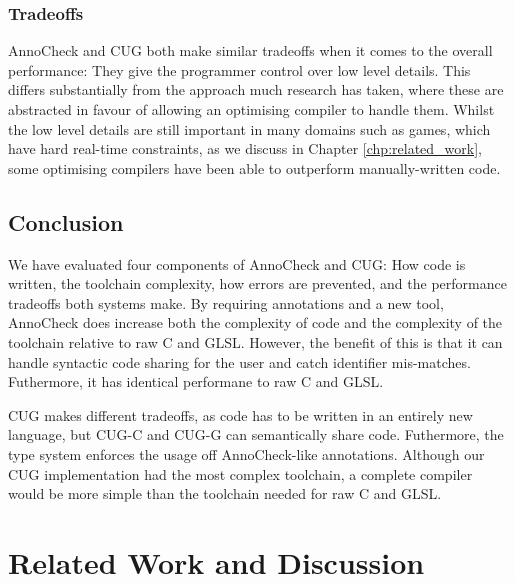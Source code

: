 \documentclass[a4paper,12pt,twoside,openright]{report}
\begin{document}
\subsection{Tradeoffs}

\label{sec:performance_tradeoffs}

AnnoCheck and CUG both make similar tradeoffs when it comes to the overall
performance: They give the programmer control over low level details. This
differs substantially from the approach much research has taken, where these
are abstracted in favour of allowing an optimising compiler to handle them.
Whilst the low level details are still important in many domains such as games,
which have hard real-time constraints, as we discuss in Chapter
\ref{chp:related_work}, some optimising compilers have been able to outperform
manually-written code.

\section{Conclusion}

We have evaluated four components of AnnoCheck and CUG: How code is written,
the toolchain complexity, how errors are prevented, and the performance
tradeoffs both systems make. By requiring annotations and a new tool, AnnoCheck
does increase both the complexity of code and the complexity of the toolchain
relative to raw C and GLSL. However, the benefit of this is that it can handle
syntactic code sharing for the user and catch identifier mis-matches.
Futhermore, it has identical performane to raw C and GLSL.

CUG makes different tradeoffs, as code has to be written in an entirely new
language, but CUG-C and CUG-G can semantically share code. Futhermore, the type
system enforces the usage off AnnoCheck-like annotations. Although our CUG
implementation had the most complex toolchain, a complete compiler would be
more simple than the toolchain needed for raw C and GLSL.

\chapter{Related Work and Discussion}


\end{document}
